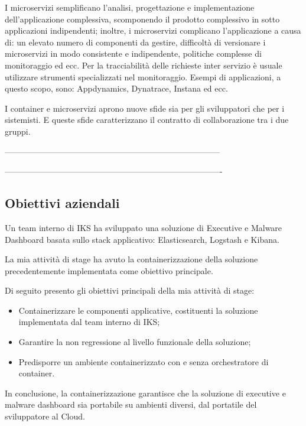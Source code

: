 I microservizi semplificano l'analisi, progettazione e implementazione 
dell'applicazione complessiva, scomponendo il prodotto complessivo in sotto 
applicazioni indipendenti; inoltre, i microservizi complicano l'applicazione a 
causa di: un elevato numero di componenti da gestire, difficoltà di versionare 
i microservizi in modo consistente e indipendente, politiche complesse di 
monitoraggio ed ecc. Per la tracciabilità delle richieste inter servizio è 
usuale utilizzare strumenti specializzati nel monitoraggio. Esempi di 
applicazioni, a questo scopo, sono: Appdynamics, Dynatrace, Instana ed ecc. 

I container e microservizi aprono nuove sfide sia per gli sviluppatori che per 
i sistemisti. E queste sfide caratterizzano il contratto di collaborazione tra 
i due gruppi. 


------------------------------------------------------------------------------

-------------------------------------------------------------------------------

\subsection{Obiettivi aziendali}

Un team interno di IKS ha sviluppato una soluzione di Executive e Malware 
Dashboard
basata sullo stack applicativo: Elasticsearch, Logstash e Kibana.
 
La mia attività di stage ha avuto la containerizzazione della soluzione 
precedentemente implementata come obiettivo principale.

Di seguito presento gli obiettivi principali della mia attività di stage:

\begin{itemize}
	\item Containerizzare le componenti applicative, costituenti la 
soluzione implementata dal team interno di IKS; 
	\item Garantire la non regressione al livello funzionale della 
soluzione;
	\item Predisporre un ambiente containerizzato con e senza orchestratore 
di container.
\end{itemize} 

In conclusione, la containerizzazione garantisce che la soluzione di executive 
e malware dashboard sia portabile su ambienti diversi, dal portatile del 
sviluppatore al Cloud.  

